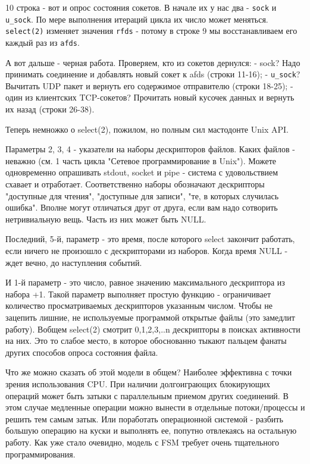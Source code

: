 10 строка - вот и опрос состояния сокетов. В начале их у нас два - \verb+sock+ и \verb+u_sock+. По мере выполнения итераций цикла их число может меняться. \verb+select(2)+ изменяет значения \verb+rfds+ - потому в строке 9 мы восстанавливаем его каждый раз из \verb+afds+.

А вот дальше - черная работа. Проверяем, кто из сокетов дернулся:\newline
- sock? Надо принимать соединение и добавлять новый сокет к afds (строки 11-16);\newline
- \verb+u_sock+? Вычитать UDP пакет и вернуть его содержимое отправителю (строки 18-25);\newline
- один из клиентских TCP-сокетов? Прочитать новый кусочек данных и вернуть их назад (строки 26-38).\newline

Теперь немножко о select(2), пожилом, но полным сил мастодонте Unix API.

Параметры 2, 3, 4 - указатели на наборы дескрипторов файлов. Каких файлов - неважно (см. 1 часть цикла "Сетевое программирование в Unix"). Можете одновременно опрашивать stdout, socket и pipe - система с удовольствием схавает и отработает. Соответственно наборы обозначают дескрипторы "доступные для чтения", "доступные для записи", "те, в которых случилась ошибка". Вполне могут отличаться друг от друга, если вам надо сотворить нетривиальную вещь. Часть из них может быть NULL.

Последний, 5-й, параметр - это время, после которого select закончит работать, если ничего не произошло с дескрипторами из наборов. Когда время NULL - ждет вечно, до наступления событий.

И 1-й параметр - это число, равное значению максимального дескриптора из набора +1. Такой параметр выполняет простую функцию - ограничивает количество просматриваемых дескрипторов указанным числом. Чтобы не зацепить лишние, не используемые программой открытые файлы (это замедлит работу). Вобщем select(2) смотрит 0,1,2,3,..n дескрипторы в поисках активности на них. Это то слабое место, в которое обоснованно тыкают пальцем фанаты других способов опроса состояния файла.

Что же можно сказать об этой модели в общем?
Наиболее эффективна с точки зрения использования CPU.
При наличии долгоиграющих блокирующих операций может быть затыки с параллельным приемом других соединений. В этом случае медленные операции можно вынести в отдельные потоки/процессы и решить тем самым затык. Или поработать операционной системой - разбить большую операцию на куски и выполнять ее, попутно отвлекаясь на остальную работу.
Как уже стало очевидно, модель с FSM требует очень тщательного программирования.

